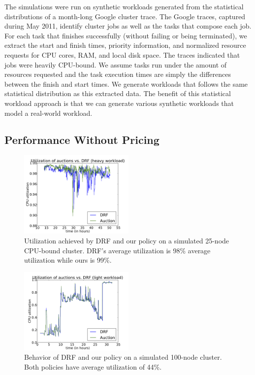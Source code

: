 \documentclass{acm_proc_article-sp}
\begin{document}
The simulations were run on synthetic workloads generated from the statistical distributions of a month-long Google cluster trace. The Google traces, captured during May 2011, identify cluster jobs as well as the tasks that compose each job. For each task that finishes successfully (without failing or being terminated), we extract the start and finish times, priority information, and normalized resource requests for CPU cores, RAM, and local disk space. The traces indicated that jobs were heavily CPU-bound. We assume tasks run under the amount of resources requested and the task execution times are simply the differences between the finish and start times. We generate workloads that follows the same statistical distribution as this extracted data. The benefit of this statistical workload approach is that we can generate various synthetic workloads that model a real-world workload.

\subsection{Performance Without Pricing}

\begin{figure}
\includegraphics[width=0.5\textwidth]{images/util_high.png}
\caption{Utilization achieved by DRF and our policy on a simulated 25-node CPU-bound cluster.  DRF's average utilization is 98\% average utilization while ours is 99\%.}
\label{img:util_high}
\end{figure}

\begin{figure}

\includegraphics[width=0.5\textwidth]{images/util_low.png}
\caption{Behavior of DRF and our policy on a simulated 100-node cluster. Both policies have average utilization of 44\%.}
\label{img:util_low}
\end{figure}
\end{document}
